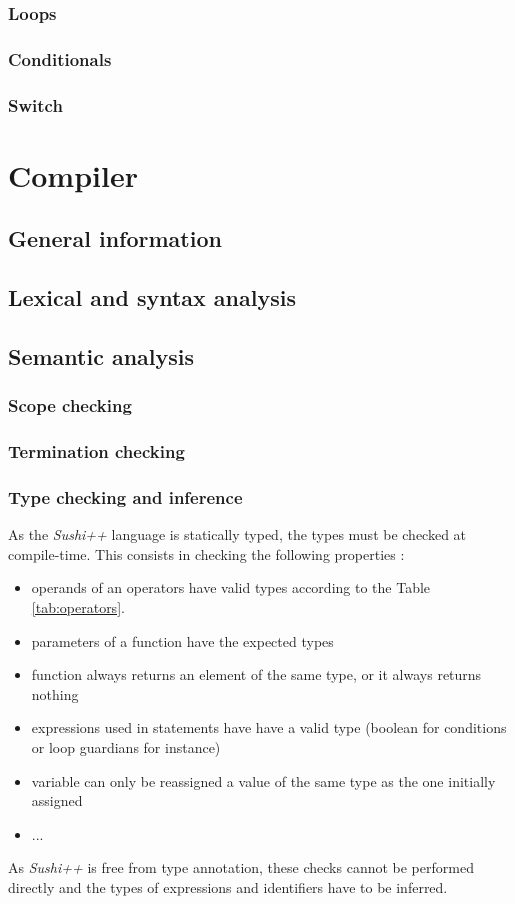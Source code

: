 \documentclass[a4paper,11pt]{article}
\begin{document}
\subsubsection{Loops}
\subsubsection{Conditionals}
\subsubsection{Switch}
\section{Compiler}
\label{sec:compiler}
\subsection{General information}
\subsection{Lexical and syntax analysis}
\subsection{Semantic analysis}
\subsubsection{Scope checking}
\subsubsection{Termination checking}
\subsubsection{Type checking and inference}
As the \textit{Sushi++} language is statically typed, the types must be checked at compile-time. This consists in checking the following properties :
\begin{itemize}
	\item operands of an operators have valid types according to the Table \ref{tab:operators}.
	\item parameters of a function have the expected types
	\item function always returns an element of the same type, or it always returns nothing
	\item expressions used in statements have have a valid type (boolean for conditions or loop guardians for instance)
	\item variable can only be reassigned a value of the same type as the one initially assigned
	\item ...
\end{itemize}
As \textit{Sushi++} is free from type annotation, these checks cannot be performed directly and the types of expressions and identifiers have to be inferred. 
\end{document}

